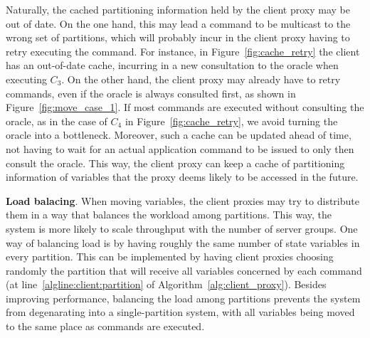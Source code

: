 
Naturally, the cached partitioning information held by the client proxy may be out of date.
On the one hand, this may lead a command to be multicast to the wrong set of partitions, which will probably incur in the client proxy having to retry executing the command.
For instance, in Figure~\ref{fig:cache_retry} the client has an out-of-date cache, incurring in a new consultation to the oracle when executing $C_3$.
On the other hand, the client proxy may already have to retry commands, even if the oracle is always consulted first, as shown in Figure~\ref{fig:move_case_1}.
If most commands are executed without consulting the oracle, as in the case of $C_4$ in Figure~\ref{fig:cache_retry}, we avoid turning the oracle into a bottleneck.
Moreover, such a cache can be updated ahead of time, not having to wait for an actual application command to be issued to only then consult the oracle.
This way, the client proxy can keep a cache of partitioning information of variables that the proxy deems likely to be accessed in the future.

\textbf{Load balacing}. When moving variables, the client proxies may try to distribute them in a way that balances the workload among partitions.
This way, the system is more likely to scale throughput with the number of server groups.
One way of balancing load is by having roughly the same number of state variables in every partition.
This can be implemented by having client proxies choosing randomly the partition that will receive all variables concerned by each command (at line~\ref                {algline:client:partition} of Algorithm~\ref{alg:client_proxy}).
Besides improving performance, balancing the load among partitions prevents the system from degenarating into a single-partition system, with all variables being moved to the same place as commands are executed.




